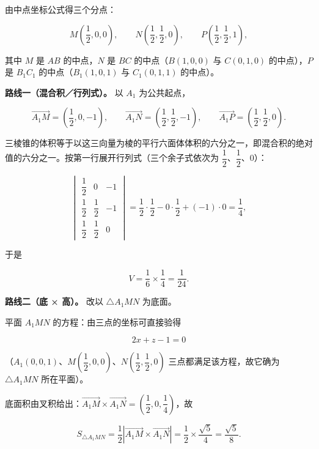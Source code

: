 \begin{answer}
由中点坐标公式得三个分点：

\nopagebreak[4]
\[
M\left(\dfrac{1}{2},0,0\right),\qquad N\left(\dfrac{1}{2},\dfrac{1}{2},0\right),\qquad P\left(\dfrac{1}{2},\dfrac{1}{2},1\right),
\]

其中 \(M\) 是 \(AB\) 的中点，\(N\) 是 \(BC\) 的中点（\(B(1,0,0)\) 与 \(C(0,1,0)\) 的中点），\(P\) 是 \(B_1C_1\) 的中点（\(B_1(1,0,1)\) 与 \(C_1(0,1,1)\) 的中点）。

\textbf{路线一（混合积／行列式）。} 以 \(A_1\) 为公共起点，

\nopagebreak[4]
\[
\overrightarrow{A_1M}=\left(\dfrac{1}{2},0,-1\right),\qquad
\overrightarrow{A_1N}=\left(\dfrac{1}{2},\dfrac{1}{2},-1\right),\qquad
\overrightarrow{A_1P}=\left(\dfrac{1}{2},\dfrac{1}{2},0\right).
\]

三棱锥的体积等于以这三向量为棱的平行六面体体积的六分之一，即混合积的绝对值的六分之一。按第一行展开行列式（三个余子式依次为 \(\dfrac{1}{2}\)、\(\dfrac{1}{2}\)、\(0\)）：

\nopagebreak[4]
\[
\begin{vmatrix}
\dfrac{1}{2} & 0 & -1\\[4pt]
\dfrac{1}{2} & \dfrac{1}{2} & -1\\[4pt]
\dfrac{1}{2} & \dfrac{1}{2} & 0
\end{vmatrix}
=\dfrac{1}{2}\cdot\dfrac{1}{2}-0\cdot\dfrac{1}{2}+(-1)\cdot0=\dfrac{1}{4},
\]

于是

\nopagebreak[4]
\[
V=\frac{1}{6}\times\frac{1}{4}=\frac{1}{24}.
\]

\textbf{路线二（底 × 高）。} 改以 \(\triangle A_1MN\) 为底面。

平面 \(A_1MN\) 的方程：由三点的坐标可直接验得

\nopagebreak[4]
\[
2x+z-1=0
\]

（\(A_1(0,0,1)\)、\(M\left(\dfrac{1}{2},0,0\right)\)、\(N\left(\dfrac{1}{2},\dfrac{1}{2},0\right)\) 三点都满足该方程，故它确为 \(\triangle A_1MN\) 所在平面）。

底面积由叉积给出：\(\overrightarrow{A_1M}\times\overrightarrow{A_1N}=\left(\dfrac{1}{2},0,\dfrac{1}{4}\right)\)，故

\nopagebreak[4]
\[
S_{\triangle A_1MN}=\frac{1}{2}\left|\overrightarrow{A_1M}\times\overrightarrow{A_1N}\right|
=\frac{1}{2}\times\frac{\sqrt{5}}{4}=\frac{\sqrt{5}}{8}.
\]


\end{answer}
